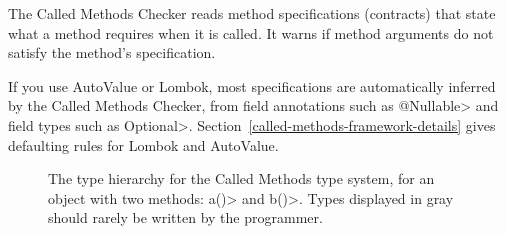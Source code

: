 The Called Methods Checker reads method specifications (contracts) that
state what a method requires when it is called.  It warns if method
arguments do not satisfy the method's specification.

If you use AutoValue or Lombok, most specifications are automatically
inferred by the Called Methods Checker, from field annotations such as
\<@Nullable> and field types such as
\<Optional>. Section~\ref{called-methods-framework-details} gives
defaulting rules for Lombok and AutoValue.

\begin{figure}
\begin{center}
  \hfill
  \hfill
\end{center}
  \caption{The type hierarchy for the Called Methods type system, for an object with two methods: \<a()> and \<b()>.
  Types displayed in gray should rarely be written by the programmer.}
  \label{fig-called-methods-types}
\end{figure}

